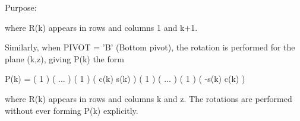 \begin{DoxyParagraph}{Purpose\+: }
\begin{DoxyVerb}
 where R(k) appears in rows and columns 1 and k+1.
 
 Similarly, when PIVOT = 'B' (Bottom pivot), the rotation is
 performed for the plane (k,z), giving P(k) the form
 
    P(k) = ( 1                                             )
           (      ...                                      )
           (             1                                 )
           (                  c(k)                    s(k) )
           (                         1                     )
           (                              ...              )
           (                                     1         )
           (                 -s(k)                    c(k) )
 
 where R(k) appears in rows and columns k and z.  The rotations are
 performed without ever forming P(k) explicitly.\end{DoxyVerb}
 
\end{DoxyParagraph}

